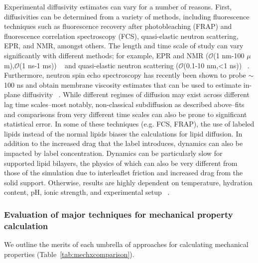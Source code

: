 \documentclass[9pt,bestpractices,pubversion]{livecoms}
\begin{document}
Experimental diffusivity estimates can vary for a number of reasons.
First, diffusivities can be determined from a variety of methods, including fluorescence techniques such as fluorescence recovery after photobleaching (FRAP) and fluorescence correlation spectroscopy (FCS), quasi-elastic neutron scattering, EPR, and NMR, amongst others.
The length and time scale of study can vary significantly with different methods; for example, EPR and NMR ($\mathcal{O}$(1 nm-100 $\mu$m),$\mathcal{O}$(1 ns-1 ms)) ~\cite{Jeschke2012a,Sahu2018,Vaz1991,Shin1991} and quasi-elastic neutron scattering ($\mathcal{O}$(0.1-10 nm,<1 ns)) ~\cite{Poger2016}.
Furthermore, neutron spin echo spectroscopy has recently been shown to probe $\sim$100 ns and obtain membrane viscosity estimates that can be used to estimate in-plane diffusivity ~\cite{Nagao2017}.
While different regimes of diffusion may exist across different lag time scales--most notably, non-classical subdiffusion as described above--fits and comparisons from very different time scales can also be prone to significant statistical error.
In some of these techniques (e.g. FCS, FRAP), the use of labeled lipids instead of the normal lipids biases the calculations for lipid diffusion.
In addition to the increased drag that the label introduces, dynamics can also be impacted by label concentration.
Dynamics can be particularly slow for supported lipid bilayers, the physics of which can also be very different from those of the simulation due to interleaflet friction and increased drag from the solid support.
Otherwise, results are highly dependent on temperature, hydration content, pH, ionic strength, and experimental setup ~\cite{Poger2016}.

\subsubsection{Evaluation of major techniques for mechanical property calculation}
\label{subsubsec:mecheval}
We outline the merits of each umbrella of approaches for calculating mechanical properties (Table~\ref{tab:mechxcomparison}).
\end{document}
